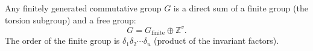 Any finitely generated commutative group $G$ is a direct sum of a finite group (the torsion subgroup) and a free group:
$$G = G_{\text{finite}} \oplus \mathbb{Z}^v.$$
The order of the finite group is $\delta_1 \delta_2 \cdots \delta_u$ (product of the invariant factors).
